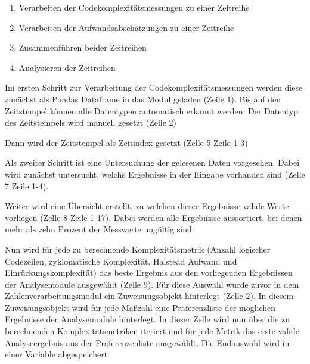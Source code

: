 \begin{enumerate}
\def\labelenumi{\arabic{enumi}.}
\item
    Verarbeiten der Codekomplexitätsmessungen zu einer Zeitreihe
\item
    Verarbeiten der Aufwandsabschätzungen zu einer Zeitreihe
\item
    Zusammenführen beider Zeitreihen
\item
    Analysieren der Zeitreihen
\end{enumerate}

Im ersten Schritt zur Verarbeitung der Codekomplexitätsmessungen werden
diese zunächst als Pandas Dataframe in das Modul geladen (Zeile 1). Bis
auf den Zeitstempel können alle Datentypen automatisch erkannt werden.
Der Datentyp des Zeitstempels wird manuell gesetzt (Zeile 2)


\lstset{style=pythonStyle}


Dann wird der Zeitstempel als Zeitindex gesetzt (Zelle 5 Zeile 1-3)

\lstset{style=pythonStyle}


Als zweiter Schritt ist eine Untersuchung der gelesenen Daten
vorgesehen. Dabei wird zunächst untersucht, welche Ergebnisse in der
Eingabe vorhanden sind (Zelle 7 Zeile 1-4).

\lstset{style=pythonStyle}


Weiter wird eine Übersicht erstellt, zu welchen dieser Ergebnisse valide
Werte vorliegen (Zelle 8 Zeile 1-17). Dabei werden alle Ergebnisse
aussortiert, bei denen mehr als zehn Prozent der Messwerte ungültig
sind.

\lstset{style=pythonStyle}


Nun wird für jede zu berechnende Komplexitätsmetrik (Anzahl logischer
Codezeilen, zyklomatische Komplexität, Halstead Aufwand und
Einrückungskomplexität) das beste Ergebnis aus den vorliegenden
Ergebnissen der Analysemodule ausgewählt (Zelle 9). Für diese Auswahl
wurde zuvor in dem Zahlenverarbeitungsmodul ein Zuweisungsobjekt
hinterlegt (Zelle 2). In diesem Zuweisungsobjekt wird für jede Maßzahl
eine Präferenzliste der möglichen Ergebnisse der Analysemodule
hinterlegt. In dieser Zelle wird nun über die zu berechnenden
Komplexitätsmetriken iteriert und für jede Metrik das erste valide
Analyseergebnis aus der Präferenzenliste ausgewählt. Die Endauswahl wird
in einer Variable abgespeichert.

